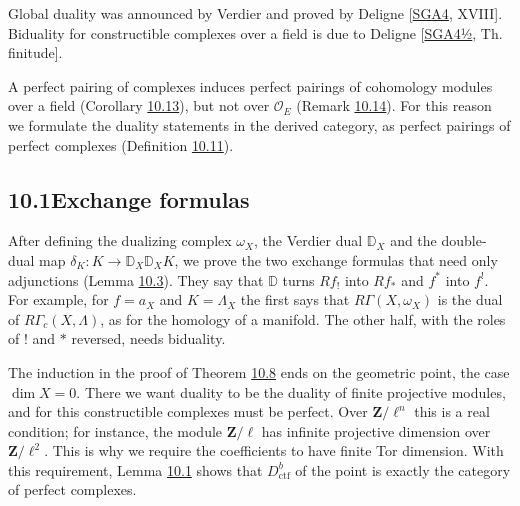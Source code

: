 \documentclass[11pt]{article}
\begin{document}
Global duality was announced by Verdier and proved by Deligne [\hyperref[bp70]{SGA4}, XVIII]. Biduality for constructible complexes over a field is due to Deligne [\hyperref[bp71]{SGA4½}, Th. finitude].

A perfect pairing of complexes induces perfect pairings of cohomology modules over a field (Corollary \hyperref[bp40]{10.13}), but not over \(\mathcal O_E\) (Remark \hyperref[bp43]{10.14}). For this reason we formulate the duality statements in the derived category, as perfect pairings of perfect complexes (Definition \hyperref[bp35]{10.11}).

\subsection*{\texorpdfstring{10.1\quad Exchange formulas}{10.1 Exchange formulas}}
\label{bp3}%
\label{bp4}%
After defining the dualizing complex \(\omega_X\), the Verdier dual \(\mathbb D_X\) and the double-dual map \(\delta_K:K\to\mathbb D_X\mathbb D_XK\), we prove the two exchange formulas that need only adjunctions (Lemma \hyperref[bp10]{10.3}). They say that \(\mathbb D\) turns \(Rf_!\) into \(Rf_*\) and \(f^*\) into \(f^!\). For example, for \(f=a_X\) and \(K=\Lambda_X\) the first says that \(R\Gamma(X,\omega_X)\) is the dual of \(R\Gamma_c(X,\Lambda)\), as for the homology of a manifold. The other half, with the roles of \(!\) and \(*\) reversed, needs biduality.

The induction in the proof of Theorem \hyperref[bp25]{10.8} ends on the geometric point, the case \(\dim X=0\). There we want duality to be the duality of finite projective modules, and for this constructible complexes must be perfect. Over \(\mathbf Z/\ell^n\) this is a real condition; for instance, the module \(\mathbf Z/\ell\) has infinite projective dimension over \(\mathbf Z/\ell^2\). This is why we require the coefficients to have finite Tor dimension. With this requirement, Lemma \hyperref[bp5]{10.1} shows that \(D^b_{\mathrm{ctf}}\) of the point is exactly the category of perfect complexes.
\end{document}
